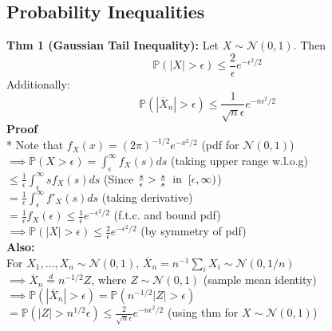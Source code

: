 \documentclass[10pt,twocolumn]{article}
\renewenvironment{proof}{{\bfseries Proof}}{\\}
\begin{document}
\subsection*{Probability Inequalities}
\textbf{Thm 1 (Gaussian Tail Inequality):}
Let $X \sim \mathcal{N}(0,1)$. Then
\begin{equation}
    \mathbb{P}(|X| > \epsilon) \leq \frac{2}{\epsilon}e^{-\epsilon^{2}/2}
\end{equation}
Additionally:
\begin{equation}
\mathbb{P}(|\overline{X}_{n}| > \epsilon) \leq \frac{1}{\sqrt{n}\epsilon}e^{-n\epsilon^{2}/2}
\end{equation}
\begin{proof}
    \mbox{}\\*
    Note that $f_{X}(x) = (2\pi)^{-1/2}e^{-x^{2}/2}$ \hfill (pdf for $\mathcal{N}(0,1)$) \\
    $\implies \mathbb{P}(X > \epsilon) = \int_{\epsilon}^{\infty} f_{X}(s) ds$ \hfill (taking upper range w.l.o.g) \\
    $\leq \frac{1}{\epsilon} \int_{\epsilon}^{\infty} s f_{X}(s) ds$ \hfill (Since $\frac{s}{\epsilon} > \frac{s}{s} \hspace{2mm}\text{in}\hspace{2mm} [\epsilon,\infty)$) \\
    $= \frac{1}{\epsilon} \int_{\epsilon}^{\infty} f'_{X}(s) ds$ \hfill (taking derivative) \\
    $= \frac{1}{\epsilon}f_{X}(\epsilon) \leq \frac{1}{\epsilon}e^{-\epsilon^{2}/2}$ \hfill (f.t.c. and bound pdf) \\
    $\implies \mathbb{P}(|X|>\epsilon) \leq \frac{2}{\epsilon} e^{-\epsilon^{2}/2}$ \hfill (by symmetry of pdf) \\
    \textbf{Also:}\\
    For $X_{1}, \ldots, X_{n} \sim \mathcal{N}(0,1)$, $\overline{X}_{n} = n^{-1}\sum_{i}X_{i} \sim \mathcal{N}(0,1/n)$ \\
    $\implies \overline{X}_{n} \stackrel{d}{=} n^{-1/2}Z$, where $Z \sim \mathcal{N}(0,1)$ \hfill (sample mean identity) \\
    $\implies \mathbb{P}(|\overline{X}_{n}| > \epsilon) = \mathbb{P}(n^{-1/2}|Z| > \epsilon)$ \\
    $= \mathbb{P}(|Z| > n^{1/2}\epsilon) \leq \frac{2}{\sqrt{n}\epsilon}e^{-n\epsilon^{2}/2}$ \hfill (using thm for $X \sim \mathcal{N}(0,1)$)
\end{proof} \\
    
\end{document}
